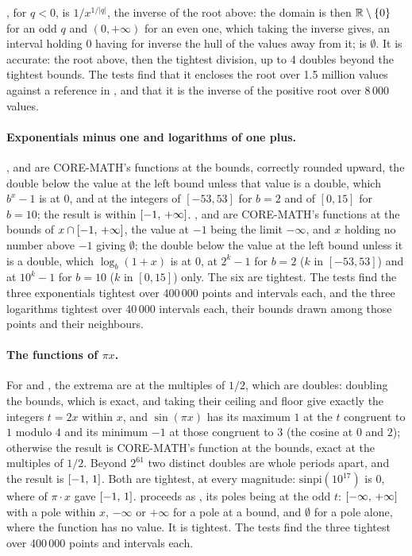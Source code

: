 \documentclass[12pt,a4paper,twoside,openright]{book}
\begin{document}
, for $q<0$, is $1/x^{1/|q|}$, the inverse of the
root above: the domain is then $\mathbb{R}\setminus\{0\}$ for an odd $q$ and
$(0, +\infty)$ for an even one, which taking the inverse gives, an interval
holding $0$ having for inverse the hull of the values away from it;
 is $\emptyset$.\newinvfive{} It is accurate: the
root above, then the tightest division, up to 4 doubles beyond the
tightest bounds. The tests find that it encloses the root over 1.5 million
values against a reference in , and that it is the
inverse of the positive root over 8\,000 values.

\paragraph{Exponentials minus one and logarithms of one plus.}
,  and  are CORE-MATH's
functions at the bounds, correctly rounded upward, the double below the
value at the left bound unless that value is a double, which $b^x-1$ is at
$0$, and at the integers of $[-53, 53]$ for $b=2$ and of $[0, 15]$ for
$b=10$; the result is within $[-1,\,+\infty]$.\newinvfive{}
,  and  are CORE-MATH's
functions at the bounds of $x\cap[-1,\,+\infty]$, the value at $-1$
being the limit $-\infty$, and $x$ holding no number above $-1$ giving
$\emptyset$; the double below the value at the left bound unless it is a
double, which $\log_b(1+x)$ is at $0$, at $2^k-1$ for $b=2$ ($k$ in
$[-53, 53]$) and at $10^k-1$ for $b=10$ ($k$ in $[0, 15]$)
only.\newinvfive{} The six are tightest. The tests find the three
exponentials tightest over 400\,000 points and intervals each, and the
three logarithms tightest over 40\,000 intervals each, their bounds drawn
among those points and their neighbours.

\paragraph{The functions of $\pi x$.}
For  and , the extrema are at the multiples
of $1/2$, which are doubles: doubling the bounds, which is exact, and
taking their ceiling and floor give exactly the integers $t=2x$ within $x$,
and $\sin(\pi x)$ has its maximum $1$ at the $t$ congruent to $1$ modulo
$4$ and its minimum $-1$ at those congruent to $3$ (the cosine at $0$ and
$2$); otherwise the result is CORE-MATH's function at the bounds, exact at
the multiples of $1/2$. Beyond $2^{61}$ two distinct doubles are whole
periods apart, and the result is $[-1,\,1]$.\newinvfive{} Both are
tightest, at every magnitude: $\mathrm{sinpi}(10^{17})$ is $0$, where
 of $\pi\cdot x$ gave $[-1,\,1]$.  proceeds as
, its poles being at the odd $t$: $[-\infty,\,+\infty]$
with a pole within $x$, $-\infty$ or $+\infty$ for a pole at a bound, and
$\emptyset$ for a pole alone, where the function has no
value.\newinvfive{} It is tightest. The tests find the three tightest over
400\,000 points and intervals each.
\end{document}
